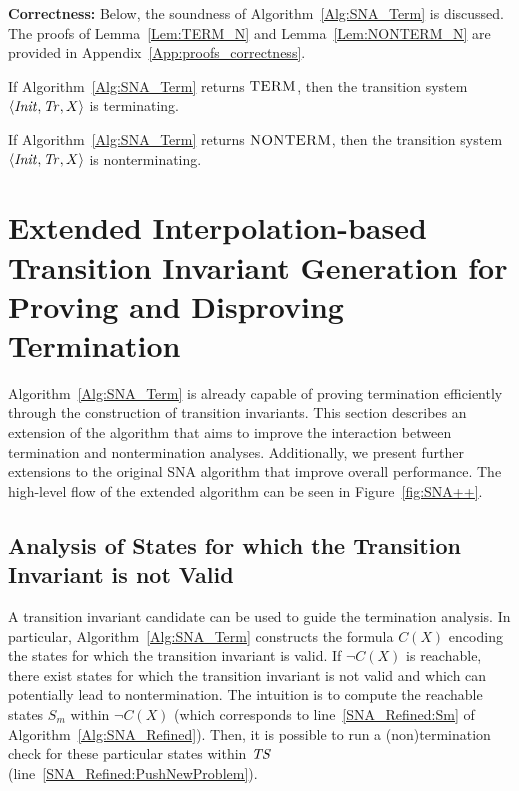 \textbf{Correctness:} Below, the soundness of Algorithm~\ref{Alg:SNA_Term} is discussed.
The proofs of Lemma~\ref{Lem:TERM_N} and Lemma~\ref{Lem:NONTERM_N} are provided in Appendix~\ref{App:proofs_correctness}.

\begin{lemma}\label{Lem:TERM_N}
    If Algorithm~\ref{Alg:SNA_Term} returns $\textsc{TERM}$, then the transition system $\langle \mathit{Init}, \mathit{Tr}, X \rangle$ is terminating.
\end{lemma}

\begin{lemma}\label{Lem:NONTERM_N}
    If Algorithm~\ref{Alg:SNA_Term} returns $\textsc{NONTERM}$, then the transition system $\langle \mathit{Init}, \mathit{Tr}, X \rangle$ is nonterminating.
\end{lemma}

\section{Extended Interpolation-based Transition Invariant Generation for Proving and Disproving Termination}\label{Sec:Extension}

Algorithm~\ref{Alg:SNA_Term} is already capable of proving termination 
efficiently through the construction of transition invariants.
This section describes an extension of the algorithm that aims to improve the interaction between termination and nontermination analyses.
Additionally, we present further extensions to the original SNA algorithm that improve overall performance. 
The high-level flow of the extended algorithm can be seen in Figure~\ref{fig:SNA++}.

\subsection{Analysis of States for which the Transition Invariant is not Valid}\label{Sec:Refinement}

A transition invariant candidate can be used to guide the termination analysis.
In particular, Algorithm~\ref{Alg:SNA_Term} constructs the formula $C(X)$ encoding the states for which the transition invariant is valid.
If $\lnot C(X)$ is reachable, there exist states for which the transition invariant is not valid and which can potentially lead to nontermination.
The intuition is to compute the reachable states $S_m$ within $\lnot C(X)$ (which corresponds to line~\ref{SNA_Refined:Sm} of Algorithm~\ref{Alg:SNA_Refined}).
Then, it is possible to run a (non)termination check for these particular states within $\mathit{TS}$ (line~\ref{SNA_Refined:PushNewProblem}).


